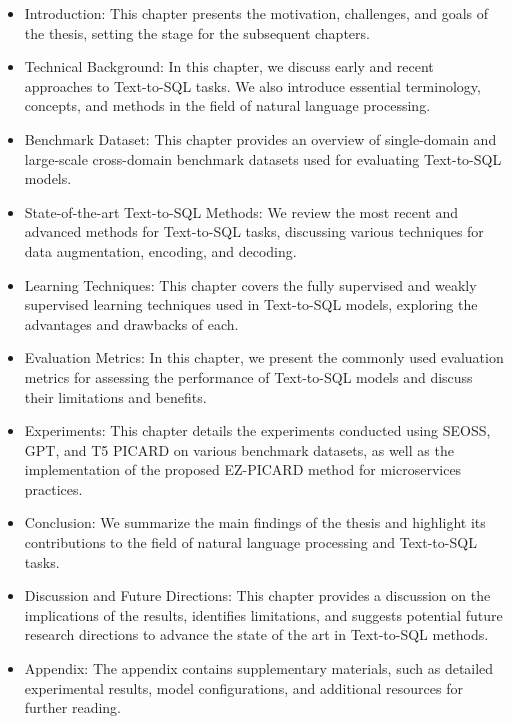 \begin{itemize}
    \item Introduction: This chapter presents the motivation, challenges, and goals of the thesis, setting the stage for the subsequent chapters.
    \item Technical Background: In this chapter, we discuss early and recent approaches to Text-to-SQL tasks. We also introduce essential terminology, concepts, and methods in the field of natural language processing.
    \item Benchmark Dataset: This chapter provides an overview of single-domain and large-scale cross-domain benchmark datasets used for evaluating Text-to-SQL models.
    \item State-of-the-art Text-to-SQL Methods: We review the most recent and advanced methods for Text-to-SQL tasks, discussing various techniques for data augmentation, encoding, and decoding.
    \item Learning Techniques: This chapter covers the fully supervised and weakly supervised learning techniques used in Text-to-SQL models, exploring the advantages and drawbacks of each.
    \item Evaluation Metrics: In this chapter, we present the commonly used evaluation metrics for assessing the performance of Text-to-SQL models and discuss their limitations and benefits.
    \item Experiments: This chapter details the experiments conducted using SEOSS, GPT, and T5 PICARD on various benchmark datasets, as well as the implementation of the proposed EZ-PICARD method for microservices practices.
    \item Conclusion: We summarize the main findings of the thesis and highlight its contributions to the field of natural language processing and Text-to-SQL tasks.
    \item Discussion and Future Directions: This chapter provides a discussion on the implications of the results, identifies limitations, and suggests potential future research directions to advance the state of the art in Text-to-SQL methods.
    \item Appendix: The appendix contains supplementary materials, such as detailed experimental results, model configurations, and additional resources for further reading.
\end{itemize}

